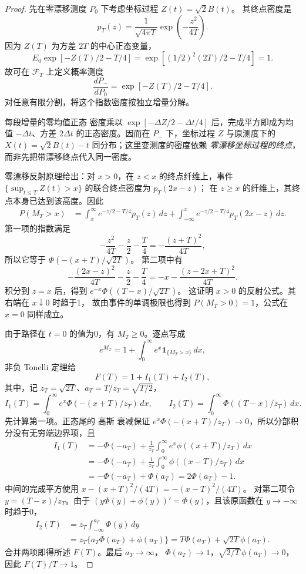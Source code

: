 \documentclass[UTF8,a4paper,11pt,fontset=fandol]{ctexart}
\theoremstyle{remark}
\begin{document}
\begin{proof}
先在零漂移测度 $P_0$ 下考虑坐标过程 $Z(t)=\sqrt2B(t)$。
其终点密度是
\[
 p_T(z)=\frac1{\sqrt{4\pi T}}\exp\!\left(-\frac{z^2}{4T}\right).
\]
因为 $Z(T)$ 为方差 $2T$ 的中心正态变量，
\[
 E_0\exp[-Z(T)/2-T/4]
 =\exp[(1/2)^2(2T)/2-T/4]=1.
\]
故可在 $\mathcal F_T$ 上定义概率测度
\[
 \frac{dP_{-}}{dP_0}=\exp[-Z(T)/2-T/4].
\]
对任意有限分割，将这个指数密度按独立增量分解。
\par 每段增量的零均值正态
密度乘以 $\exp[-\Delta Z/2-\Delta t/4]$ 后，完成平方即成为均值
$-\Delta t$、方差 $2\Delta t$ 的正态密度。因而在 $P_-$ 下，坐标过程
$Z$ 与原测度下的 $X(t)=\sqrt2B(t)-t$ 同分布；这里变测度的密度依赖
\emph{零漂移坐标过程的终点}，而非先把带漂移终点代入同一密度。

零漂移反射原理给出：对 $x>0$，在 $z<x$ 的终点纤维上，事件
$\{\sup_{t\le T}Z(t)>x\}$ 的联合终点密度为 $p_T(2x-z)$；
在 $z\ge x$ 的纤维上，其终点本身已达到该高度。因此
\begin{align*}
 P(M_T>x)
 &=\int_x^\infty e^{-z/2-T/4}p_T(z)\,dz
 +\int_{-\infty}^x e^{-z/2-T/4}p_T(2x-z)\,dz.
\end{align*}
第一项的指数满足
\[
 -\frac{z^2}{4T}-\frac z2-\frac T4
 =-\frac{(z+T)^2}{4T},
\]
所以它等于 $\Phi(-(x+T)/\sqrt{2T})$。
第二项中有
\[
 -\frac{(2x-z)^2}{4T}-\frac z2-\frac T4
 =-x-\frac{(z-2x+T)^2}{4T}.
\]
积分到 $z=x$ 后，得到 $e^{-x}\Phi((T-x)/\sqrt{2T})$。
这证明 $x>0$ 的反射公式。其右端在 $x\downarrow0$ 时趋于1，
故由事件的单调极限也得到 $P(M_T>0)=1$，公式在 $x=0$ 同样成立。

由于路径在 $t=0$ 的值为0，有 $M_T\ge0$。逐点写成
\[
 e^{M_T}=1+\int_0^\infty e^x\mathbf1_{\{M_T>x\}}\,dx,
\]
非负 Tonelli 定理给
\[
 F(T)=1+I_1(T)+I_2(T),
\]
其中，记 $z_T=\sqrt{2T}$、$a_T=T/z_T=\sqrt{T/2}$，
\[
 I_1(T)=\int_0^\infty e^x\Phi(-(x+T)/z_T)\,dx,
 \qquad I_2(T)=\int_0^\infty\Phi((T-x)/z_T)\,dx.
\]
先计算第一项。正态尾的 高斯 衰减保证
$e^x\Phi(-(x+T)/z_T)\to0$，所以分部积分没有无穷端边界项，且
\begin{align*}
 I_1(T)
 &=-\Phi(-a_T)+\frac1{z_T}\int_0^\infty
 e^x\phi((x+T)/z_T)\,dx\\
 &=-\Phi(-a_T)+\frac1{z_T}\int_0^\infty
 \phi((x-T)/z_T)\,dx\\
 &=-\Phi(-a_T)+\Phi(a_T)=2\Phi(a_T)-1.
\end{align*}
中间的完成平方使用
$x-(x+T)^2/(4T)=-(x-T)^2/(4T)$。
对第二项令 $y=(T-x)/z_T$。由于
$(y\Phi(y)+\phi(y))'=\Phi(y)$，且该原函数在 $y\to-\infty$ 时趋于0，
\begin{align*}
 I_2(T)&=z_T\int_{-\infty}^{a_T}\Phi(y)\,dy\\
 &=z_T\{a_T\Phi(a_T)+\phi(a_T)\}
 =T\Phi(a_T)+\sqrt{2T}\phi(a_T).
\end{align*}
合并两项即得所述 $F(T)$。最后 $a_T\to\infty$，
$\Phi(a_T)\to1$，$\sqrt{2/T}\,\phi(a_T)\to0$，因此 $F(T)/T\to1$。
\end{proof}
\end{document}
